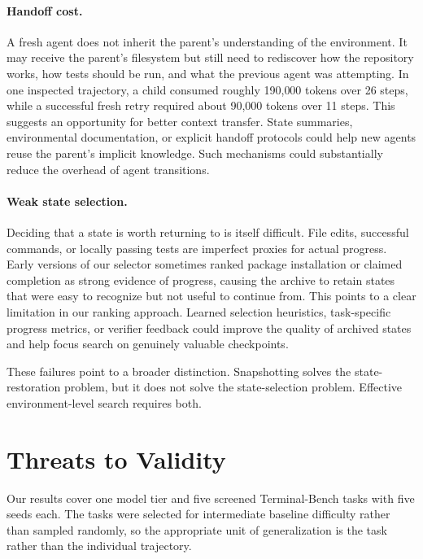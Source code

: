 \documentclass{article}
\begin{document}
\paragraph{Handoff cost.}
A fresh agent does not inherit the parent's understanding of the environment. It may receive the parent's filesystem but still need to rediscover how the repository works, how tests should be run, and what the previous agent was attempting. In one inspected trajectory, a child consumed roughly 190{,}000 tokens over 26 steps, while a successful fresh retry required about 90{,}000 tokens over 11 steps. This suggests an opportunity for better context transfer. State summaries, environmental documentation, or explicit handoff protocols could help new agents reuse the parent's implicit knowledge. Such mechanisms could substantially reduce the overhead of agent transitions.

\paragraph{Weak state selection.}
Deciding that a state is worth returning to is itself difficult. File edits, successful commands, or locally passing tests are imperfect proxies for actual progress. Early versions of our selector sometimes ranked package installation or claimed completion as strong evidence of progress, causing the archive to retain states that were easy to recognize but not useful to continue from. This points to a clear limitation in our ranking approach. Learned selection heuristics, task-specific progress metrics, or verifier feedback could improve the quality of archived states and help focus search on genuinely valuable checkpoints.

These failures point to a broader distinction. Snapshotting solves the state-restoration problem, but it does not solve the state-selection problem. Effective environment-level search requires both.

\section{Threats to Validity}
\label{sec:threats}

Our results cover one model tier and five screened Terminal-Bench tasks with five seeds each. The tasks were selected for intermediate baseline difficulty rather than sampled randomly, so the appropriate unit of generalization is the task rather than the individual trajectory.
\end{document}
